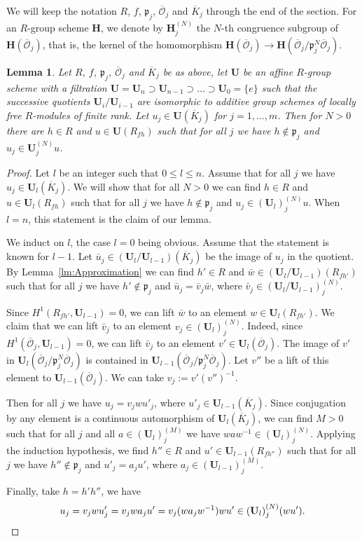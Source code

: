 \documentclass[11pt]{amsart}
\theoremstyle{plain}
\newtheorem{lemma}[proposition]{Lemma}
\theoremstyle{definition}
\theoremstyle{remark}
\newcommand\fp{{\mathfrak{p}}}
\newcommand\cO{{\mathcal{O}}}
\newcommand\bH{{\mathbf H}}
\newcommand\bU{{\mathbf U}}
\begin{document}
We will keep the notation $R$, $f$, $\fp_j$, $\overline\cO_j$ and $\overline K_j$ through the end of the section. For an $R$-group scheme $\bH$, we denote by $\bH^{(N)}_j$ the $N$-th congruence subgroup of $\bH(\overline\cO_j)$, that is, the kernel of the homomorphism $\bH(\overline\cO_j)\to\bH(\overline\cO_j/\fp_j^N\overline\cO_j)$.
\begin{lemma}\label{lm:ApproxU}
  Let $R$, $f$, $\fp_j$, $\overline\cO_j$ and $\overline K_j$ be as above, let $\bU$ be an affine $R$-group scheme with a filtration $\bU=\bU_n\supset\bU_{n-1}\supset\ldots\supset\bU_0=\{e\}$ such that the successive quotients $\bU_i/\bU_{i-1}$ are isomorphic to additive group schemes of locally free $R$-modules of finite rank. Let $u_j\in\bU(\overline K_j)$ for $j=1,\ldots,m$. Then for $N>0$ there are $h\in R$ and $u\in\bU(R_{fh})$ such that for all $j$ we have $h\notin\fp_j$ and $u_j\in \bU^{(N)}_ju$.
\end{lemma}
\begin{proof}
  Let $l$ be an integer such that $0\le l\le n$. Assume that for all $j$ we have $u_j\in\bU_l(\overline K_j)$. We will show that for all $N>0$ we can find $h\in R$ and $u\in\bU_l(R_{fh})$ such that for all $j$ we have $h\notin\fp_j$ and $u_j\in (\bU_l)^{(N)}_ju$. When $l=n$, this statement is the claim of our lemma.

  We induct on $l$, the case $l=0$ being obvious. Assume that the statement is known for $l-1$. Let $\bar u_j\in(\bU_l/\bU_{l-1})(\overline K_j)$ be the image of $u_j$ in the quotient. By Lemma~\ref{lm:Approximation} we can find $h'\in R$ and $\bar w\in(\bU_l/\bU_{l-1})(R_{fh'})$ such that for all $j$ we have $h'\notin\fp_j$ and $\bar u_j=\bar v_j \bar w$, where $\bar v_j\in (\bU_l/\bU_{l-1})^{(N)}_j$.

  Since $H^1(R_{fh'},\bU_{l-1})=0$, we can lift $\bar w$ to an element $w\in\bU_l(R_{fh'})$. We claim that we can lift $\bar v_j$ to an element $v_j\in(\bU_l)^{(N)}_j$. Indeed, since $H^1(\overline\cO_j,\bU_{l-1})=0$, we can lift $\bar v_j$ to an element $v'\in\bU_l(\overline\cO_j)$. The image of $v'$ in $\bU_l(\overline\cO_j/\fp_j^N\overline\cO_j)$ is contained in $\bU_{l-1}(\overline\cO_j/\fp_j^N\overline\cO_j)$.
  Let $v''$ be a lift of this element to $\bU_{l-1}(\overline\cO_j)$. We can take $v_j:=v'(v'')^{-1}$.

  Then for all $j$ we have $u_j=v_jwu'_j$, where $u'_j\in\bU_{l-1}(\overline K_j)$. Since conjugation by any element is a continuous automorphism of $\bU_l(\overline K_j)$, we can find $M>0$ such that for all $j$ and all $a\in(\bU_l)^{(M)}_j$ we have $waw^{-1}\in(\bU_l)^{(N)}_j$. Applying the induction hypothesis, we find $h''\in R$ and $u'\in\bU_{l-1}(R_{fh''})$ such that for all $j$ we have $h''\notin\fp_j$ and $u'_j=a_ju'$, where $a_j\in(\bU_{l-1})^{(M)}_j$.

  Finally, take $h=h'h''$, we have
  \[
    u_j=v_jwu'_j=v_jwa_ju'=v_j(wa_jw^{-1})wu'\in(\bU_l)^{(N)}_j(wu').
  \qedhere\]
\end{proof}
\end{document}
